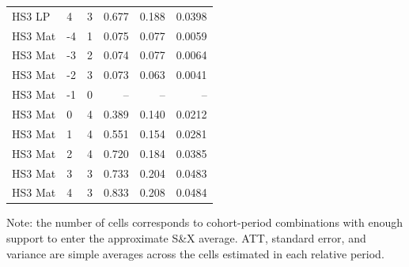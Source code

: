 \begin{table}[!htbp]
\begin{tabular}{llrrrr}
HS3 LP & 4 & 3 & 0.677 & 0.188 & 0.0398 \\
HS3 Mat & -4 & 1 & 0.075 & 0.077 & 0.0059 \\
HS3 Mat & -3 & 2 & 0.074 & 0.077 & 0.0064 \\
HS3 Mat & -2 & 3 & 0.073 & 0.063 & 0.0041 \\
HS3 Mat & -1 & 0 & -- & -- & -- \\
HS3 Mat & 0 & 4 & 0.389 & 0.140 & 0.0212 \\
HS3 Mat & 1 & 4 & 0.551 & 0.154 & 0.0281 \\
HS3 Mat & 2 & 4 & 0.720 & 0.184 & 0.0385 \\
HS3 Mat & 3 & 3 & 0.733 & 0.204 & 0.0483 \\
HS3 Mat & 4 & 3 & 0.833 & 0.208 & 0.0484 \\
\bottomrule
\end{tabular}
\begin{flushleft}
\footnotesize Note: the number of cells corresponds to cohort-period combinations with enough support to enter the approximate S\&X average. ATT, standard error, and variance are simple averages across the cells estimated in each relative period.
\end{flushleft}
\end{table}



